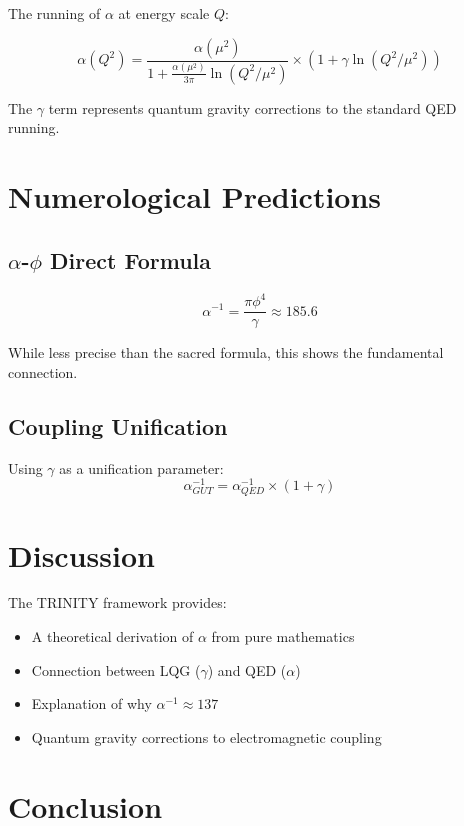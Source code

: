 \documentclass[12pt,a4paper]{article}
\begin{document}
The running of $\alpha$ at energy scale $Q$:

\begin{equation}
\alpha(Q^2) = \frac{\alpha(\mu^2)}{1 + \frac{\alpha(\mu^2)}{3\pi}\ln(Q^2/\mu^2)} \times (1 + \gamma \ln(Q^2/\mu^2))
\end{equation}

The $\gamma$ term represents quantum gravity corrections to the standard QED running.

\section{Numerological Predictions}

\subsection{$\alpha$-$\phi$ Direct Formula}

\begin{equation}
\alpha^{-1} = \frac{\pi \phi^4}{\gamma} \approx 185.6
\end{equation}

While less precise than the sacred formula, this shows the fundamental connection.

\subsection{Coupling Unification}

Using $\gamma$ as a unification parameter:
\begin{equation}
\alpha_{GUT}^{-1} = \alpha_{QED}^{-1} \times (1 + \gamma)
\end{equation}

\section{Discussion}

The TRINITY framework provides:
\begin{itemize}
\item A theoretical derivation of $\alpha$ from pure mathematics
\item Connection between LQG ($\gamma$) and QED ($\alpha$)
\item Explanation of why $\alpha^{-1} \approx 137$
\item Quantum gravity corrections to electromagnetic coupling
\end{itemize}

\section{Conclusion}
\end{document}
